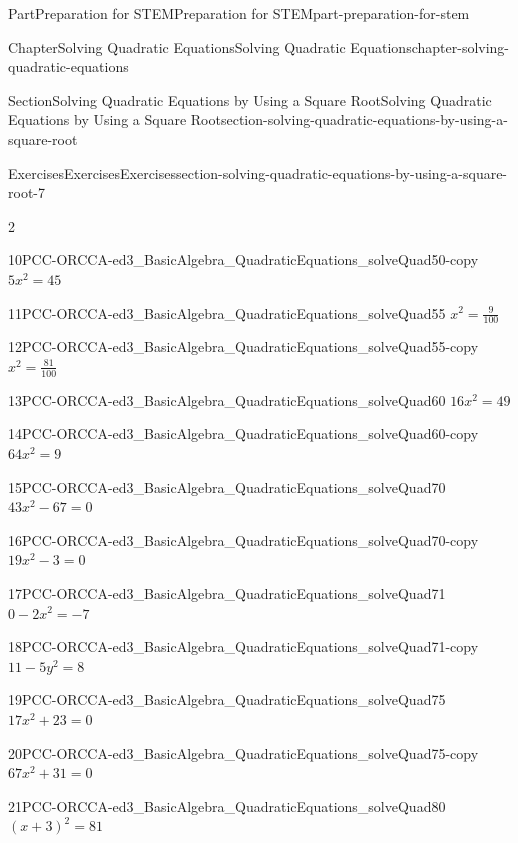 \documentclass[twoside,10pt,]{book}
\numberwithin{equation}{section}
\begin{document}
\begin{partptx}{Part}{Preparation for STEM}{}{Preparation for STEM}{}{}{part-preparation-for-stem}
\begin{chapterptx}{Chapter}{Solving Quadratic Equations}{}{Solving Quadratic Equations}{}{}{chapter-solving-quadratic-equations}
\begin{sectionptx}{Section}{Solving Quadratic Equations by Using a Square Root}{}{Solving Quadratic Equations by Using a Square Root}{}{}{section-solving-quadratic-equations-by-using-a-square-root}
\begin{exercises-subsection}{Exercises}{Exercises}{}{Exercises}{}{}{section-solving-quadratic-equations-by-using-a-square-root-7}
\begin{exercisegroupcol}{2}
\begin{divisionexerciseegcol}{10}{}{}{PCC-ORCCA-ed3_BasicAlgebra_QuadraticEquations_solveQuad50-copy}
\(5x^2 = 45\)%
\end{divisionexerciseegcol}%
\begin{divisionexerciseegcol}{11}{}{}{PCC-ORCCA-ed3_BasicAlgebra_QuadraticEquations_solveQuad55}%
\(x^2 = {{\frac{9}{100}}}\)%
\end{divisionexerciseegcol}%
\begin{divisionexerciseegcol}{12}{}{}{PCC-ORCCA-ed3_BasicAlgebra_QuadraticEquations_solveQuad55-copy}%
\(x^2 = {{\frac{81}{100}}}\)%
\end{divisionexerciseegcol}%
\begin{divisionexerciseegcol}{13}{}{}{PCC-ORCCA-ed3_BasicAlgebra_QuadraticEquations_solveQuad60}%
\(16x^2 = 49\)%
\end{divisionexerciseegcol}%
\begin{divisionexerciseegcol}{14}{}{}{PCC-ORCCA-ed3_BasicAlgebra_QuadraticEquations_solveQuad60-copy}%
\(64x^2 = 9\)%
\end{divisionexerciseegcol}%
\begin{divisionexerciseegcol}{15}{}{}{PCC-ORCCA-ed3_BasicAlgebra_QuadraticEquations_solveQuad70}%
\(43x^2  - 67= 0\)%
\end{divisionexerciseegcol}%
\begin{divisionexerciseegcol}{16}{}{}{PCC-ORCCA-ed3_BasicAlgebra_QuadraticEquations_solveQuad70-copy}%
\(19x^2  - 3= 0\)%
\end{divisionexerciseegcol}%
\begin{divisionexerciseegcol}{17}{}{}{PCC-ORCCA-ed3_BasicAlgebra_QuadraticEquations_solveQuad71}%
\(0-2x^2 = -7\)%
\end{divisionexerciseegcol}%
\begin{divisionexerciseegcol}{18}{}{}{PCC-ORCCA-ed3_BasicAlgebra_QuadraticEquations_solveQuad71-copy}%
\(11-5y^2 = 8\)%
\end{divisionexerciseegcol}%
\begin{divisionexerciseegcol}{19}{}{}{PCC-ORCCA-ed3_BasicAlgebra_QuadraticEquations_solveQuad75}%
\(17x^2  + 23= 0\)%
\end{divisionexerciseegcol}%
\begin{divisionexerciseegcol}{20}{}{}{PCC-ORCCA-ed3_BasicAlgebra_QuadraticEquations_solveQuad75-copy}%
\(67x^2  + 31= 0\)%
\end{divisionexerciseegcol}%
\begin{divisionexerciseegcol}{21}{}{}{PCC-ORCCA-ed3_BasicAlgebra_QuadraticEquations_solveQuad80}%
\(\left(x+3\right)^2 = 81\)%

\end{divisionexerciseegcol}
\end{exercisegroupcol}
\end{exercises-subsection}
\end{sectionptx}
\end{chapterptx}
\end{partptx}
\end{document}
